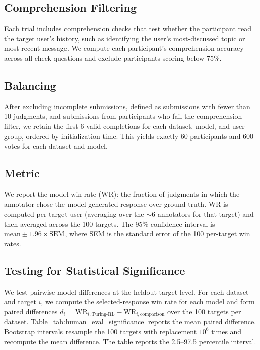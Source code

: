 \documentclass{article} %
\begin{document}
\subsection{Comprehension Filtering}
Each trial includes comprehension checks that test whether the participant read the target user's history, such as identifying the user's most-discussed topic or most recent message. We compute each participant's comprehension accuracy across all check questions and exclude participants scoring below 75\%. 

\subsection{Balancing}
After excluding incomplete submissions, defined as submissions with fewer than 10 judgments, and submissions from participants who fail the comprehension filter, we retain the first 6 valid completions for each dataset, model, and user group, ordered by initialization time. This yields exactly 60 participants and 600 votes for each dataset and model. 

\subsection{Metric}
We report the model win rate (WR): the fraction of judgments in which the annotator chose the model-generated response over ground truth. WR is computed per target user (averaging over the ${\sim}6$ annotators for that target) and then averaged across the 100 targets. The 95\% confidence interval is $\text{mean} \pm 1.96 \times \text{SEM}$, where SEM is the standard error of the 100 per-target win rates.

\subsection{Testing for Statistical Significance}
\label{app:human-eval-significance}
We test pairwise model differences at the heldout-target level. For each dataset and target $i$, we compute the selected-response win rate for each model and form paired differences $d_i = \text{WR}_{i,\text{Turing-RL}} - \text{WR}_{i,\text{comparison}}$ over the 100 targets per dataset. Table~\ref{tab:human_eval_significance} reports the mean paired difference. Bootstrap intervals resample the 100 targets with replacement $10^6$ times and recompute the mean difference. The table reports the 2.5--97.5 percentile interval. 
\end{document}
